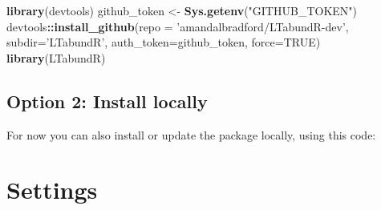\documentclass[
]{book}
\newenvironment{Shaded}{\begin{snugshade}}{\end{snugshade}}
\newcommand{\CommentTok}[1]{\textcolor[rgb]{0.56,0.35,0.01}{\textit{#1}}}
\newcommand{\ControlFlowTok}[1]{\textcolor[rgb]{0.13,0.29,0.53}{\textbf{#1}}}
\newcommand{\DataTypeTok}[1]{\textcolor[rgb]{0.13,0.29,0.53}{#1}}
\newcommand{\KeywordTok}[1]{\textcolor[rgb]{0.13,0.29,0.53}{\textbf{#1}}}
\newcommand{\NormalTok}[1]{#1}
\newcommand{\OperatorTok}[1]{\textcolor[rgb]{0.81,0.36,0.00}{\textbf{#1}}}
\newcommand{\OtherTok}[1]{\textcolor[rgb]{0.56,0.35,0.01}{#1}}
\newcommand{\StringTok}[1]{\textcolor[rgb]{0.31,0.60,0.02}{#1}}
\begin{document}
\begin{Shaded}
\begin{Highlighting}[]
\KeywordTok{library}\NormalTok{(devtools)}
\NormalTok{github_token <-}\StringTok{ }\KeywordTok{Sys.getenv}\NormalTok{(}\StringTok{"GITHUB_TOKEN"}\NormalTok{)}
\NormalTok{devtools}\OperatorTok{::}\KeywordTok{install_github}\NormalTok{(}\DataTypeTok{repo =} \StringTok{'amandalbradford/LTabundR-dev'}\NormalTok{,}
                         \DataTypeTok{subdir=}\StringTok{'LTabundR'}\NormalTok{,}
                         \DataTypeTok{auth_token=}\NormalTok{github_token,}
                         \DataTypeTok{force=}\OtherTok{TRUE}\NormalTok{)}
\KeywordTok{library}\NormalTok{(LTabundR)}
\end{Highlighting}
\end{Shaded}

\hypertarget{option-2-install-locally}{%
\section*{Option 2: Install locally}\label{option-2-install-locally}}

For now you can also install or update the package locally, using this code:

\begin{Shaded}
\end{Shaded}

\hypertarget{settings}{%
\chapter{Settings}\label{settings}}
\end{document}
